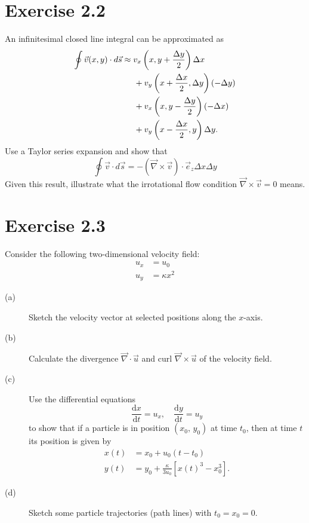 \documentclass[a4paper, 10pt]{article}
\begin{document}
\section*{Exercise 2.2}
An infinitesimal closed line integral can be approximated as
\begin{align}
    \begin{split}
        \oint\vec{v}(x,y)\cdot d\vec{s} &\approx v_x\left(x,y+\frac{\Delta y}{2}\right)\Delta x \\
        &\hspace{5mm}+ v_y \left(x+\frac{\Delta x}{2}, \Delta y\right)(-\Delta y)\\
        &\hspace{5mm}+ v_x \left(x, y-\frac{\Delta y}{2}\right)(-\Delta x)\\
        &\hspace{5mm}+ v_y \left(x-\frac{\Delta x}{2}, y\right) \Delta y.
    \end{split}
\end{align}
Use a Taylor series expansion and show that
\begin{equation}
    \oint \vec{v}\cdot d\vec{s} = - \left(\vec{\nabla}\times\vec{v}\right)\cdot\vec{e}_z \Delta x \Delta y
\end{equation}
Given this result, illustrate what the irrotational flow condition $\vec{\nabla}\times\vec{v}=0$ means.

\section*{Exercise 2.3}
Consider the following two-dimensional velocity field:
\begin{align}
	u_x &= u_0\\
	u_y &= \kappa x^2
\end{align}

\begin{description}
	\item[(a)]
	Sketch the velocity vector at selected positions along the $x$-axis.
	
	\item[(b)]
	Calculate the divergence $\vec{\nabla}\cdot\vec{u}$ and curl $\vec{\nabla}\times \vec{u}$ of the velocity field.
	
	\item[(c)]
	Use the differential equations
	\begin{equation}
		\frac{\mathrm{d}x}{\mathrm{d}t} = u_x, \quad \frac{\mathrm{d}y}{\mathrm{d}t} = u_y
	\end{equation}
	to show that if a particle is in position $(x_0,\, y_0)$ at time $t_0$, then at time $t$ its position is given by
	\begin{align}
		x(t) &= x_0 + u_0(t-t_0)\\
		y(t) &= y_0 + \frac{\kappa}{3u_0}\left[x(t)^3 - x_0^3\right].
	\end{align}
	
	\item[(d)]
	Sketch some particle trajectories (path lines) with $t_0=x_0=0$.
\end{description}
\end{document}
